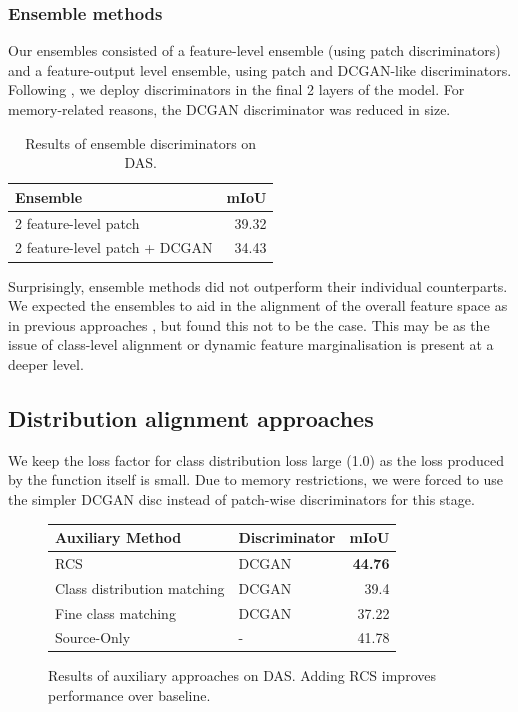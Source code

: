 \documentclass[a4paper,12pt]{report}
\begin{document}
\subsubsection{Ensemble methods}
Our ensembles consisted of a feature-level ensemble (using patch discriminators) and a feature-output level ensemble, using patch and DCGAN-like discriminators. Following \cite{tsai_learning_2020}, we deploy discriminators in the final 2 layers of the model. For memory-related reasons, the DCGAN discriminator was reduced in size.

\begin{table}[]
    \centering
    \begin{tabular}{|l|r|}
        \hline
        Ensemble                      & \multicolumn{1}{l|}{mIoU} \\ \hline
        2 feature-level patch         & 39.32                     \\ \hline
        2 feature-level patch + DCGAN & 34.43                     \\ \hline
    \end{tabular}
    \caption{Results of ensemble discriminators on DAS.}
\end{table}

Surprisingly, ensemble methods did not outperform their individual counterparts. We expected the ensembles to aid in the alignment of the overall feature space as in previous approaches \cite{hoffman_fcns_2016} \cite{chen_learning_2017}, but found this not to be the case. This may be as the issue of class-level alignment or dynamic feature marginalisation is present at a deeper level.

\subsection{Distribution alignment approaches}
We keep the loss factor for class distribution loss large (1.0) as the loss produced by the function itself is small. Due to memory restrictions, we were forced to use the simpler DCGAN disc instead of patch-wise discriminators for this stage.

\begin{figure}[]
    \centering
    \begin{tabular}{|l|l|r|}
        \hline
        Auxiliary Method            & Discriminator & \multicolumn{1}{l|}{mIoU} \\ \hline
        RCS                         & DCGAN         & \textbf{44.76}            \\ \hline
        Class distribution matching & DCGAN         & 39.4                      \\ \hline
        Fine class matching         & DCGAN         & 37.22                     \\ \hline
        Source-Only                 & -             & 41.78                     \\ \hline
    \end{tabular}
    \caption{Results of auxiliary approaches on DAS. Adding RCS improves performance over baseline.}
\end{figure}
\end{document}

